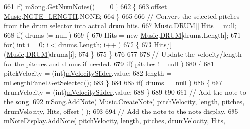 \begin{DoxyCode}
661             \textcolor{keywordflow}{if}( \hyperlink{group___s_c_priv_var_ga9554e9b3758d1cc1e841a5f7d8aa9f56}{mSong}.\hyperlink{group___song_const_gad124d0af146885327f8ac455bc013b63}{GetNumNotes}() == 0 )
662             \{
663                 offset = \hyperlink{class_music}{Music}.\hyperlink{group___music_enums_gaf11b5f079adbb21c800b9eca1c5c3cbd}{NOTE\_LENGTH}.NONE;
664             \}
665 
666             \textcolor{comment}{// Convert the selected pitches from the drum selector into actual drum hits.}
667             \hyperlink{class_music}{Music}.\hyperlink{group___music_enums_gade475b4382c7066d1af13e7c13c029b6}{DRUM}[] Hits = null;
668             \textcolor{keywordflow}{if}( drums != null )
669             \{
670                 Hits = \textcolor{keyword}{new} \hyperlink{class_music}{Music}.\hyperlink{group___music_enums_gade475b4382c7066d1af13e7c13c029b6}{DRUM}[drums.Length];
671                 \textcolor{keywordflow}{for}( \textcolor{keywordtype}{int} i = 0; i < drums.Length; i++ )
672                 \{
673                     Hits[i] = (\hyperlink{class_music}{Music}.\hyperlink{group___music_enums_gade475b4382c7066d1af13e7c13c029b6}{DRUM})drums[i];
674                 \}
675             \}
676 
677 
678             \textcolor{comment}{// Update the velocity/length for the pitches and drums if needed.}
679             \textcolor{keywordflow}{if}( pitches != null )
680             \{
681                 pitchVelocity = (int)\hyperlink{group___s_c_priv_var_ga0738678367556ebb69df6e73213f616d}{mVelocitySlider}.value;
682                 length = \hyperlink{group___s_c_priv_var_ga370237b50bc11a581fc963cdd8ffd4ea}{mLengthPanel}.\hyperlink{group___s_c_handlers_gac1a7dd19ee5cf14d87a09e803432acd1}{GetSelected}();
683             \}
684 
685             \textcolor{keywordflow}{if}( drums != null )
686             \{
687                 drumVelocity = (int)\hyperlink{group___s_c_priv_var_ga0738678367556ebb69df6e73213f616d}{mVelocitySlider}.value;
688             \}
689 
690 
691             \textcolor{comment}{// Add the note to the song.}
692             \hyperlink{group___s_c_priv_var_ga9554e9b3758d1cc1e841a5f7d8aa9f56}{mSong}.\hyperlink{group___song_const_gab7c8fe4dc29f5ae7b7728c583fe51f7e}{AddNote}( \hyperlink{class_music}{Music}.\hyperlink{group___music_stat_func_gaaf74885e43eb623f64f961985fadcd08}{CreateNote}( pitchVelocity, length, pitches, 
      drumVelocity, Hits, offset ) );
693 
694             \textcolor{comment}{// Add the note to the note display.}
695             \hyperlink{group___s_c_priv_var_ga19cefeb7077126193c7f60d07dfdf32c}{mNoteDisplay}.\hyperlink{class_note_display_container_aa108ddf1c59c22600eb47b6ccc831573}{AddNote}( pitchVelocity, length, pitches, drumVelocity, Hits, 

\end{DoxyCode}
